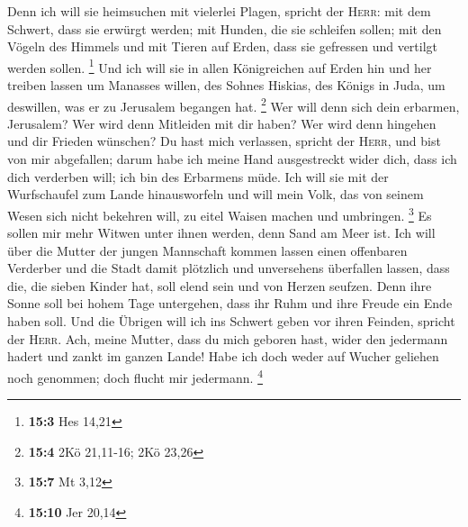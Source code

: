  Denn ich will sie heimsuchen mit vielerlei Plagen,
spricht der \textsc{Herr}: mit dem Schwert, dass sie erwürgt werden; mit
Hunden, die sie schleifen sollen; mit den Vögeln des Himmels und mit
Tieren auf Erden, dass sie gefressen und vertilgt werden sollen.
\footnote{\textbf{15:3} Hes 14,21}  Und ich will sie in
allen Königreichen auf Erden hin und her treiben lassen um Manasses
willen, des Sohnes Hiskias, des Königs in Juda, um deswillen, was er zu
Jerusalem begangen hat. \footnote{\textbf{15:4} 2Kö 21,11-16; 2Kö 23,26}
 Wer will denn sich dein erbarmen, Jerusalem? Wer wird
denn Mitleiden mit dir haben? Wer wird denn hingehen und dir Frieden
wünschen?  Du hast mich verlassen, spricht der
\textsc{Herr}, und bist von mir abgefallen; darum habe ich meine Hand
ausgestreckt wider dich, dass ich dich verderben will; ich bin des
Erbarmens müde.  Ich will sie mit der Wurfschaufel zum
Lande hinausworfeln und will mein Volk, das von seinem Wesen sich nicht
bekehren will, zu eitel Waisen machen und umbringen. \footnote{\textbf{15:7}
  Mt 3,12}  Es sollen mir mehr Witwen unter ihnen werden,
denn Sand am Meer ist. Ich will über die Mutter der jungen Mannschaft
kommen lassen einen offenbaren Verderber und die Stadt damit plötzlich
und unversehens überfallen lassen,  dass die, die sieben
Kinder hat, soll elend sein und von Herzen seufzen. Denn ihre Sonne soll
bei hohem Tage untergehen, dass ihr Ruhm und ihre Freude ein Ende haben
soll. Und die Übrigen will ich ins Schwert geben vor ihren Feinden,
spricht der \textsc{Herr}.  Ach, meine Mutter, dass du
mich geboren hast, wider den jedermann hadert und zankt im ganzen Lande!
Habe ich doch weder auf Wucher geliehen noch genommen; doch flucht mir
jedermann. \footnote{\textbf{15:10} Jer 20,14}

